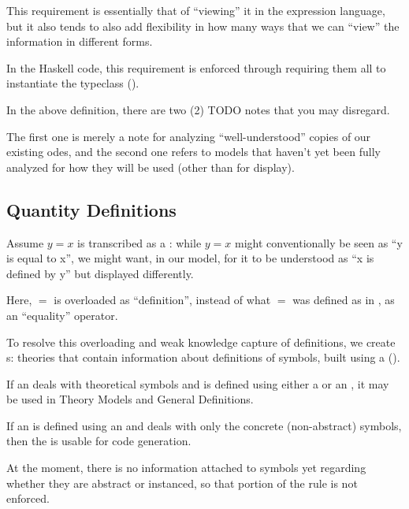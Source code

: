This requirement is essentially that of ``viewing'' it in the expression
language, but it also tends to also add flexibility in how many ways that we can
``view'' the information in different forms.

In the Haskell code, this requirement is enforced through requiring them all to
instantiate the \Express{} typeclass ().

\currentModelKindsHaskell{}

In the above \ModelKinds{} definition, there are two (2) TODO notes that you may
disregard.

The first one is merely a note for analyzing ``well-understood'' copies of our
existing \acsp{ode}, and the second one refers to models that haven't yet been
fully analyzed for how they will be used (other than for display).

\subsection{Quantity Definitions}

\currentQDefinitionHaskell{}

Assume \(y = x\) is transcribed as a \RelationConcept{}: while \(y = x\) might
conventionally be seen as ``y is equal to x'', we might want, in our model, for
it to be understood as ``x is defined by y'' but displayed differently.

Here, \(=\) is overloaded as ``definition'', instead of what \(=\) was defined
as in \Expr{}, as an ``equality'' operator.

To resolve this overloading and weak knowledge capture of definitions, we create
\EquationalModel{}s: theories that contain information about definitions of
symbols, built using a \QDefinition{} ().

If an \EquationalModel{} deals with theoretical symbols and is defined using
either a \ModelExpr{} or an \Expr{}, it may be used in Theory Models and General
Definitions.

If an \EquationalModel{} is defined using an \Expr{} and deals with only the
concrete (non-abstract) symbols, then the \EquationalModel{} is usable for code
generation.

At the moment, there is no information attached to symbols yet regarding whether
they are abstract or instanced, so that portion of the rule is not enforced.


